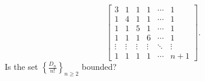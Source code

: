 \[
\left[
\begin{array}{cccccc}
3 & 1 & 1 & 1 & \cdots & 1 \\
1 & 4 & 1 & 1 & \cdots & 1 \\
1 & 1 & 5 & 1 & \cdots & 1 \\
1 & 1 & 1 & 6 & \cdots & 1 \\
\vdots & \vdots & \vdots & \vdots & \ddots & \vdots \\
1 & 1 & 1 & 1 & \cdots & n+1
\end{array}
\right].
\]
Is the set $\left\{ \frac{D_n}{n!} \right\}_{n \geq 2}$ bounded?
